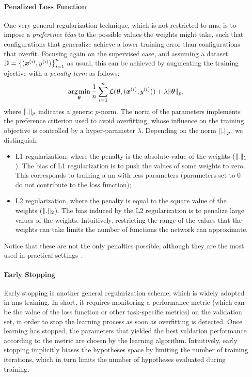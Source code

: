 \paragraph{Penalized Loss Function}
One very general regularization technique, which is not restricted to \glspl{nn}, is to impose a \emph{preference bias} to the possible values the weights might take, such that configurations that generalize achieve a lower training error than configurations that overfit. Focusing again on the supervised case, and assuming a dataset $\Data = \Set{(\PatternVector{x}{i}, \Pattern{y}{i})}_{i=1}^n$ as usual, this can be achieved by augmenting the training ojective with a \emph{penalty term} as follows:
$$\argmin_{\Param} \frac{1}{n} \sum_{i=1}^n \Loss(\Param, (\PatternVector{x}{i}, \Pattern{y}{i})) + \lambda\norm{\Param}_p,$$
where $\mathopen\| . \mathclose\|_p$ indicates a generic $p$-norm. The norm of the parameters implements the preference criterion used to avoid overfitting, whose influence on the training objective is controlled by a hyper-parameter $\lambda$. Depending on the norm $\mathopen\| . \mathclose\|_p$, we distinguish:
\begin{itemize}
    \item L1 regularization, where the penalty is the absolute value of the weights ($\mathopen\| . \mathclose\|_1$). The bias of L1 regularization is to push the values of some weights to zero. This corresponds to training a \gls{nn} with less parameters (parameters set to 0 do not contribute to the loss function);
    \item L2 regularization, where the penalty is equal to the square value of the weights ($\mathopen\| . \mathclose\|_2$). The bias induced by the L2 regularization is to penalize large values of the weights. Intuitively, restricting the range of the values that the weights can take limits the number of functions the network can approximate.
\end{itemize}
Notice that these are not the only penalties possible, although they are the most used in practical settings \citep{hastie2009elements}.

\paragraph{Early Stopping}
Early stopping \citep{prechelt1998earlystopping} is another general regularization scheme, which is widely adopted in \glspl{nn} training. In short, it requires monitoring a performance metric (which can be the value of the loss function or other task-specific metrics) on the validation set, in order to stop the learning process as soon as overfitting is detected. Once learning has stopped, the parameters that yielded the best valdation performance according to the metric are chosen by the learning algorithm. Intuitively, early stopping implicitly biases the hypotheses space by limiting the number of training iterations, which in turn limits the number of hypotheses evaluated during training.

